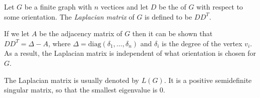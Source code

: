 \documentclass[12pt]{article}
\begin{document}
Let $G$ be a finite graph with $n$ vectices and let $D$ be the  of $G$ with respect to some orientation.
The \emph{Laplacian matrix} of $G$ is defined to be $DD^T$.

If we let $A$ be the adjacency matrix of $G$ then it can be shown
that $DD^T = \Delta - A$,
where $\Delta=\textrm{diag}(\delta_1, \ldots, \delta_n)$ and 
$\delta_i$ is the degree of
the vertex $v_i$. As a result, the Laplacian matrix is independent of what orientation is
chosen for $G$. 

The  Laplacian matrix is usually denoted by $L(G)$. It is a positive semidefinite
singular matrix, so that the   smallest eigenvalue is 0.
\end{document}
